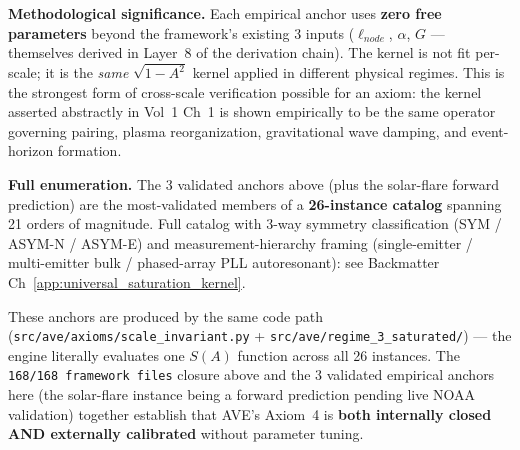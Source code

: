 \noindent \textbf{Methodological significance.} Each empirical anchor uses \textbf{zero free parameters} beyond the framework's existing 3 inputs ($\ell_{node}$, $\alpha$, $G$ --- themselves derived in Layer~8 of the derivation chain). The kernel is not fit per-scale; it is the \emph{same} $\sqrt{1 - A^2}$ kernel applied in different physical regimes. This is the strongest form of cross-scale verification possible for an axiom: the kernel asserted abstractly in Vol~1 Ch~1 is shown empirically to be the same operator governing pairing, plasma reorganization, gravitational wave damping, and event-horizon formation.

\noindent \textbf{Full enumeration.} The 3 validated anchors above (plus the solar-flare forward prediction) are the most-validated members of a \textbf{26-instance catalog} spanning 21 orders of magnitude. Full catalog with 3-way symmetry classification (SYM / ASYM-N / ASYM-E) and measurement-hierarchy framing (single-emitter / multi-emitter bulk / phased-array PLL autoresonant): see Backmatter Ch~\ref{app:universal_saturation_kernel}.

These anchors are produced by the same code path (\texttt{src/ave/axioms/scale\_invariant.py} + \texttt{src/ave/regime\_3\_saturated/}) --- the engine literally evaluates one $S(A)$ function across all 26 instances. The \texttt{168/168 framework files} closure above and the 3 validated empirical anchors here (the solar-flare instance being a forward prediction pending live NOAA validation) together establish that AVE's Axiom~4 is \textbf{both internally closed AND externally calibrated} without parameter tuning.
